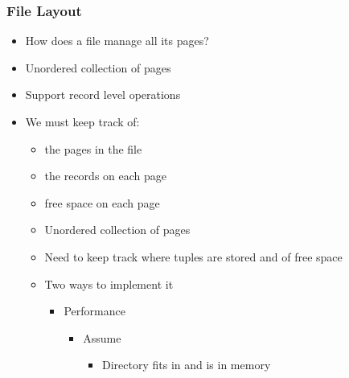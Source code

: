 \subsubsection{File Layout}
\begin{itemize}
    \item How does a file manage all its pages?
    \item Unordered collection of pages
    \item Support record level operations
    \item We must keep track of:
        \begin{itemize}
            \item the pages in the file
            \item the records on each page
            \item free space on each page
        \end{itemize}
        \begin{itemize}
            \item Unordered collection of pages
            \item Need to keep track where tuples are stored and of free space
            \item Two ways to implement it
                \begin{itemize}
                     One single page
                        \begin{itemize}
                            \item Kind of the root
                            \item Has to pointer to two linked lists
                                \begin{itemize}
                                    \item Free pages list
                                    \item Data pages list
                                \end{itemize}
                        \end{itemize}
                    \icon No global view on data
                    \item Performance
                        \begin{itemize}
                            \item Assume
                                \begin{itemize}
                                    \item Directory fits in and is in memory

\end{itemize}
\end{itemize}
\end{itemize}
\end{itemize}
\end{itemize}

